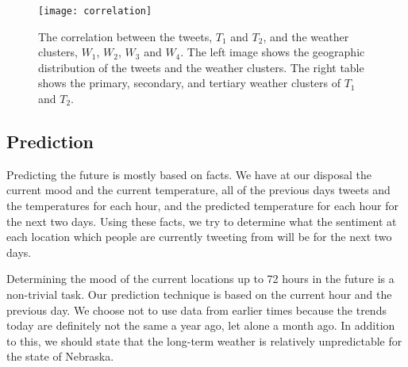 \begin{figure}[t]
\begin{center}
\texttt{[image: correlation]}
\end{center}
\vspace{-.1in}
\caption{The correlation between the tweets, $T_1$ and $T_2$, and the weather clusters, $W_1$, $W_2$, $W_3$ and $W_4$. The left image shows the geographic distribution of the tweets and the weather clusters. The right table shows the primary, secondary, and tertiary weather clusters of $T_1$ and $T_2$.}
\label{fig:correlation}
\end{figure}


\subsection{Prediction}
\label{sec:pred}

Predicting the future is mostly based on facts. We have at our disposal the current mood and the current temperature, all of the previous days tweets and the temperatures for each hour, and the predicted temperature for each hour for the next two days. Using these facts, we try to determine what the sentiment at each location which people are currently tweeting from will be for the next two days.

Determining the mood of the current locations up to 72 hours in the future is a non-trivial task. Our prediction technique is based on the current hour and the previous day. We choose not to use data from earlier times because the trends today are definitely not the same a year ago, let alone a month ago. In addition to this, we should state that the long-term weather is relatively unpredictable for the state of Nebraska.

